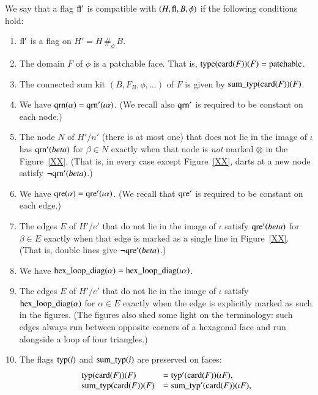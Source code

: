 \begin{definition}
We say that a flag $\op{fl}'$ is compatible with
$(H,\op{fl},B,\phi)$  if the following conditions hold:
    \begin{enumerate}
    \item $\op{fl}'$ is a flag on $H'= H\,\#_\phi\, B$.
    \item The domain $F$ of $\phi$ is a patchable face.  That is,
    $\op{type}(\card(F))(F) = \op{patchable}$.
    \item The connected sum kit $(B,F_B,\phi,\ldots)$ of $F$ is given by
    $\op{sum\_typ}(\card(F))(F)$.
    \item We have $\op{qrn}(\alpha) = \op{qrn}'(\iota\alpha)$.
    (We recall also $\op{qrn}'$ is required to be constant on each
    node.)
    \item The node $N$ of $H'/n'$ (there is at most one) that does not lie in the image of
    $\iota$ has
        $\op{qrn}'(\beta)$ for $\beta\in N$ exactly when that node
        is {\it not} marked $\otimes$ in the Figure~\ref{XX}.  (That is, in
        every case except Figure~\ref{XX}, darts at a new node satisfy
        $\neg\op{qrn}'(\beta)$.)
    \item We have $\op{qre}(\alpha)= \op{qre}'(\iota\alpha)$.
    (We recall that $\op{qre}'$ is required to be constant on each
    edge.)
    \item The edges $E$ of $H'/e'$ that do not lie in the image of
    $\iota$ satisfy $\op{qre}'(\beta)$ for $\beta\in E$ exactly
    when that edge is marked as a single line in Figure~\ref{XX}.
    (That is, double lines give $\neg\op{qre}'(\beta)$.)
    \item We have $\op{hex\_loop\_diag}(\alpha) =
    \op{hex\_loop\_diag}(\iota\alpha)$.
    \item The edges $E$ of $H'/e'$ that do not lie in the image of
    $\iota$ satisfy $\op{hex\_loop\_diag}(\alpha)$ for $\alpha\in E$
    exactly when the edge is explicitly marked as such in the
    figures.  (The figures also shed some light on the terminology: such
    edges always run between opposite corners of a hexagonal face
    and run alongside a loop of four triangles.)
    \item The flags $\op{typ}(i)$ and
    $\op{sum\_typ}(i)$ are preserved on faces:
        $$
        \begin{array}{lll}
        \op{typ}(\card(F))(F) &= \op{typ}'(\card(F))(\iota F),\\
        \op{sum\_typ}(\card(F))(F) &= \op{sum\_typ}'(\card(F))(\iota F),\\

\end{array}$$
\end{enumerate}
\end{definition}
